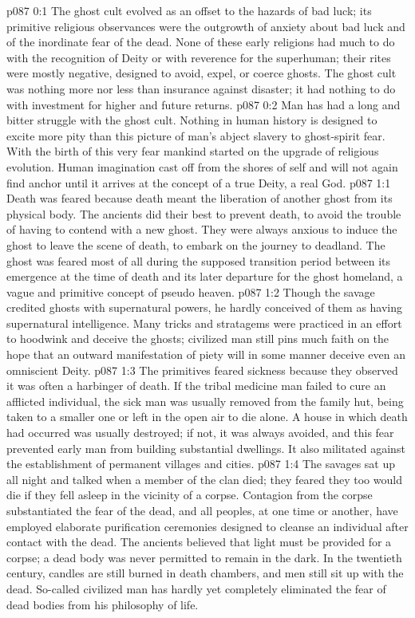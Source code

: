 \author{Brilliant Evening Star}
\vs p087 0:1 The ghost cult evolved as an offset to the hazards of bad luck; its primitive religious observances were the outgrowth of anxiety about bad luck and of the inordinate fear of the dead. None of these early religions had much to do with the recognition of Deity or with reverence for the superhuman; their rites were mostly negative, designed to avoid, expel, or coerce ghosts. The ghost cult was nothing more nor less than insurance against disaster; it had nothing to do with investment for higher and future returns.
\vs p087 0:2 Man has had a long and bitter struggle with the ghost cult. Nothing in human history is designed to excite more pity than this picture of man’s abject slavery to ghost\hyp{}spirit fear. With the birth of this very fear mankind started on the upgrade of religious evolution. Human imagination cast off from the shores of self and will not again find anchor until it arrives at the concept of a true Deity, a real God.
\vs p087 1:1 Death was feared because death meant the liberation of another ghost from its physical body. The ancients did their best to prevent death, to avoid the trouble of having to contend with a new ghost. They were always anxious to induce the ghost to leave the scene of death, to embark on the journey to deadland. The ghost was feared most of all during the supposed transition period between its emergence at the time of death and its later departure for the ghost homeland, a vague and primitive concept of pseudo heaven.
\vs p087 1:2 Though the savage credited ghosts with supernatural powers, he hardly conceived of them as having supernatural intelligence. Many tricks and stratagems were practiced in an effort to hoodwink and deceive the ghosts; civilized man still pins much faith on the hope that an outward manifestation of piety will in some manner deceive even an omniscient Deity.
\vs p087 1:3 The primitives feared sickness because they observed it was often a harbinger of death. If the tribal medicine man failed to cure an afflicted individual, the sick man was usually removed from the family hut, being taken to a smaller one or left in the open air to die alone. A house in which death had occurred was usually destroyed; if not, it was always avoided, and this fear prevented early man from building substantial dwellings. It also militated against the establishment of permanent villages and cities.
\vs p087 1:4 The savages sat up all night and talked when a member of the clan died; they feared they too would die if they fell asleep in the vicinity of a corpse. Contagion from the corpse substantiated the fear of the dead, and all peoples, at one time or another, have employed elaborate purification ceremonies designed to cleanse an individual after contact with the dead. The ancients believed that light must be provided for a corpse; a dead body was never permitted to remain in the dark. In the twentieth century, candles are still burned in death chambers, and men still sit up with the dead. So\hyp{}called civilized man has hardly yet completely eliminated the fear of dead bodies from his philosophy of life.
